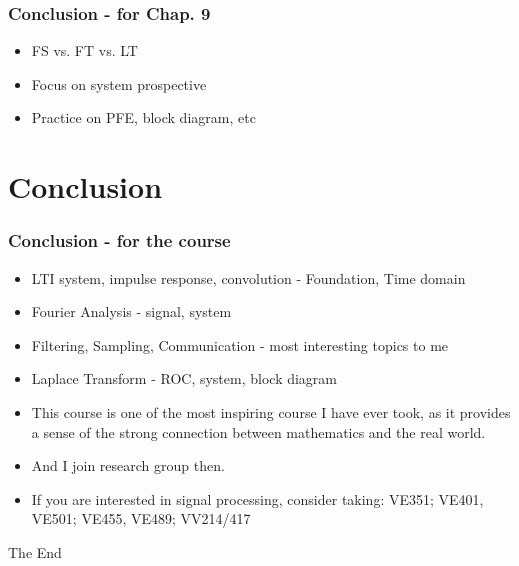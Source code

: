 \documentclass{beamer}
\begin{document}
\begin{frame}
    \frametitle{Conclusion - for Chap. 9}
    \begin{itemize}
    \item FS vs. FT vs. LT
    \item Focus on system prospective
    \item Practice on PFE, block diagram, etc 
    \end{itemize}
\end{frame}





\section{Conclusion}
\begin{frame}
\frametitle{Conclusion - for the course}
\begin{itemize}
\item LTI system, impulse response, convolution - Foundation, Time domain
\item Fourier Analysis - signal, system
\item Filtering, Sampling, Communication - most interesting topics to me
\item Laplace Transform - ROC, system, block diagram
\item This course is one of the most inspiring course I have ever took, as it provides a sense of the strong connection between mathematics and the real world.
\item And I join research group then.
\item If you are interested in signal processing, consider taking: VE351; VE401, VE501; VE455, VE489; VV214/417
\end{itemize}
\end{frame}


\begin{frame}
\Huge{\centerline{The End}}
\end{frame}

\end{document}
